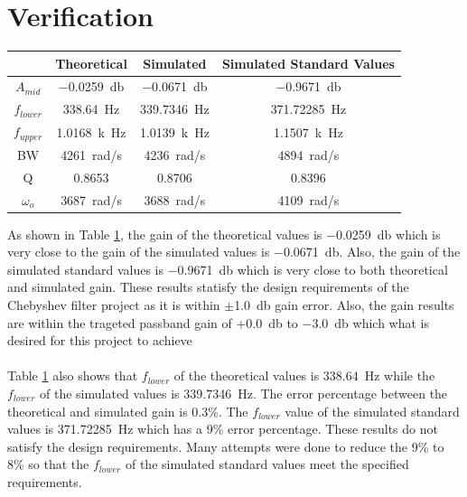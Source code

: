 \documentclass[hidelinks]{article}
\begin{document}
	\pagebreak
	\section{Verification}
	\begin{table}[htbp]
		\centering
		\begin{tabular}{|c|c|c|c|}
			\hline
			& Theoretical & Simulated & Simulated Standard Values\\
			\hline\hline
			$A_{mid}$ & \SI{-0.0259}{\decibel} & \SI{-0.0671}{\decibel} & \SI{-0.9671}{\decibel}\\
			\hline
			$f_{lower}$ & \SI{338.64}{\hertz} & \SI{339.7346}{\hertz} & \SI{371.72285}{\hertz}\\
			\hline
			$f_{upper}$ & \SI{1.0168}{k\hertz} & \SI{1.0139}{k\hertz} & \SI{1.1507}{k\hertz}\\
			\hline
			BW & \SI{4261}{\radian/\second} & \SI{4236}{\radian/\second} & \SI{4894}{\radian/\second}\\
			\hline
			Q & 0.8653 & 0.8706 & 0.8396\\
			\hline
			$\omega_o$ & \SI{3687}{\radian/\second} & \SI{3688}{\radian/\second} & \SI{4109}{\radian/\second}\\
			\hline 
		\end{tabular}
	\label{onlyTable}
	\end{table}
	\noindent As shown in Table \ref{onlyTable}, the gain of the theoretical values is \SI{-0.0259}{\decibel} which is very close to the gain of the simulated values is \SI{-0.0671}{\decibel}. 
	Also, the gain of the simulated standard values is \SI{-0.9671}{\decibel} which is very close to both theoretical and simulated gain.
	These results statisfy the design requirements of the Chebyshev filter project as it is within $\pm$\SI{1.0}{\decibel} gain error.
	Also, the gain results are within the trageted passband gain of +\SI{0.0}{\decibel} to \SI{-3.0}{\decibel} which what is desired for this project to achieve\\\\
	Table \ref{onlyTable} also shows that $f_{lower}$ of the theoretical values is \SI{338.64}{\hertz} while the $f_{lower}$ of the simulated values is \SI{339.7346}{\hertz}.
	The error percentage between the theoretical and simulated gain is 0.3\%.
	The $f_{lower}$ value of the simulated standard values is \SI{371.72285}{\hertz} which has a 9\% error percentage.
	These results do not satisfy the design requirements.
	Many attempts were done to reduce the 9\% to 8\% so that the $f_{lower}$ of the simulated standard values meet the specified requirements.
\end{document}
